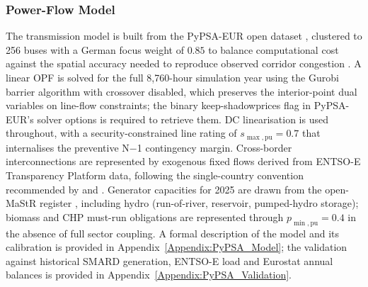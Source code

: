 
\subsubsection{Power-Flow Model}\label{Subsubsec3:PyPSA_model}
 
The transmission model is built from the PyPSA-EUR open dataset \citep{Brown_2018_PyPSA_Eur, Frysztacki_2020_Modeling_Curtailment_Germany, Frysztacki_2021_Network_Resolution_VRE}, clustered to 256 buses with a German focus weight of $0.85$ to balance computational cost against the spatial accuracy needed to reproduce observed corridor congestion \citep{Frysztacki_2020_Modeling_Curtailment_Germany}. A linear OPF is solved for the full 8{,}760-hour simulation year using the Gurobi barrier algorithm with crossover disabled, which preserves the interior-point dual variables on line-flow constraints; the binary keep-shadowprices flag in PyPSA-EUR's solver options is required to retrieve them. DC linearisation is used throughout, with a security-constrained line rating of $s_{\max,\mathrm{pu}} = 0.7$ that internalises the preventive N$-$1 contingency margin. Cross-border interconnections are represented by exogenous fixed flows derived from ENTSO-E Transparency Platform data, following the single-country convention recommended by \citet{Frysztacki_2021_Network_Resolution_VRE} and \citet{Thomassen_2024_Redispatch_and_Congestion_Management_Forecast}. Generator capacities for 2025 are drawn from the open-MaStR register \citep{MaStR_2025_open_register}, including hydro (run-of-river, reservoir, pumped-hydro storage); biomass and CHP must-run obligations are represented through $p_{\min,\mathrm{pu}} = 0.4$ in the absence of full sector coupling. A formal description of the model and its calibration is provided in Appendix~\ref{Appendix:PyPSA_Model}; the validation against historical SMARD generation, ENTSO-E load and Eurostat annual balances is provided in Appendix~\ref{Appendix:PyPSA_Validation}.
 
